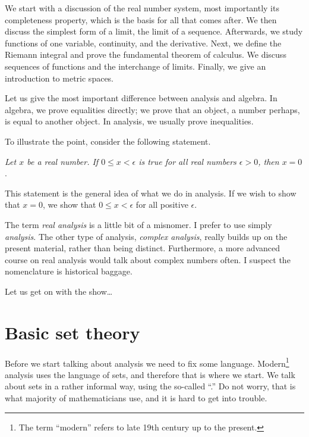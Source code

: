 \documentclass[12pt]{book}
\begin{document}
\medskip

We start with a discussion of the real number system, most importantly its completeness property, which is the basis for all that comes after.
We then discuss the simplest form of a limit, the limit of a sequence.  
Afterwards, we study functions of one variable, continuity, and the derivative.
Next, we define the Riemann integral and prove the fundamental theorem of calculus.  
We discuss sequences of functions and the interchange of limits.  
Finally, we give an introduction to metric spaces.

Let us give the most important difference between analysis and algebra.  
In algebra, we prove equalities directly; we prove that an object, a number perhaps, is equal to another object.  
In analysis, we usually prove inequalities.  

To illustrate the point, consider the following statement.

\medskip

\emph{Let $x$ be a real number.
If $0 \leq x < \epsilon$ is true for all real numbers $\epsilon > 0$, then $x = 0$}.

\medskip

This statement is the general idea of what we do in analysis.
If we wish to show that $x = 0$, we show that $0 \leq x < \epsilon$ for all positive $\epsilon$.

\medskip

The term \emph{real analysis} is a little bit of a misnomer.
I prefer to use simply \emph{analysis}.
The other type of analysis, 
\emph{complex analysis}, really builds up on the present material, rather than being distinct.
Furthermore, a more advanced course on real analysis would talk about complex numbers often.
I suspect the nomenclature is historical baggage.


\medskip

Let us get on with the show\ldots



\sectionnewpage
\section{Basic set theory} \label{sec:basicset}


Before we start talking about analysis we need to fix some language.
Modern\footnote{The term ``modern'' refers to late 19th century up to
the present.}
analysis uses the language of sets, and therefore that is where we start.
We talk about sets in a rather informal way, using the so-called
``.''  Do not worry, that is what majority of
mathematicians use, and it is hard to get into trouble.
\end{document}
